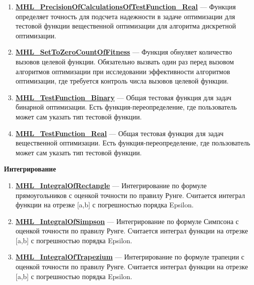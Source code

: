 \documentclass[a4paper,12pt]{article}
\begin{document}
\begin{enumerate}
\item \textbf{\hyperref[MHL_PrecisionOfCalculationsOfTestFunction_Real]{MHL\_PrecisionOfCalculationsOfTestFunction\_Real}} --- Функция определяет точность для подсчета надежности в задаче оптимизации для тестовой функции вещественной оптимизации для алгоритма дискретной оптимизации.

\item \textbf{\hyperref[MHL_SetToZeroCountOfFitness]{MHL\_SetToZeroCountOfFitness}} --- Функция обнуляет количество вызовов целевой функции. Обязательно вызвать один раз перед вызовом алгоритмов оптимизации при исследовании эффективности    алгоритмов оптимизации, где требуется контроль числа вызовов целевой функции.

\item \textbf{\hyperref[MHL_TestFunction_Binary]{MHL\_TestFunction\_Binary}} --- Общая тестовая функция для задач бинарной оптимизации. Есть функция-переопределение, где пользователь может сам указать тип тестовой функции.

\item \textbf{\hyperref[MHL_TestFunction_Real]{MHL\_TestFunction\_Real}} --- Общая тестовая функция для задач вещественной оптимизации. Есть функция-переопределение, где пользователь может сам указать тип тестовой функции.

\end{enumerate}

\textbf{Интегрирование}
\begin{enumerate}

\item \textbf{\hyperref[MHL_IntegralOfRectangle]{MHL\_IntegralOfRectangle}} --- Интегрирование по формуле прямоугольников с оценкой точности по правилу Рунге. Считается интеграл функции на отрезке [a,b] с погрешностью порядка Epsilon.

\item \textbf{\hyperref[MHL_IntegralOfSimpson]{MHL\_IntegralOfSimpson}} --- Интегрирование по формуле Симпсона с оценкой точности по правилу Рунге. Считается интеграл функции на отрезке [a,b] с погрешностью порядка Epsilon.

\item \textbf{\hyperref[MHL_IntegralOfTrapezium]{MHL\_IntegralOfTrapezium}} --- Интегрирование по формуле трапеции с оценкой точности по правилу Рунге. Считается интеграл функции на отрезке [a,b] с погрешностью порядка Epsilon.

\end{enumerate}
\end{document}
